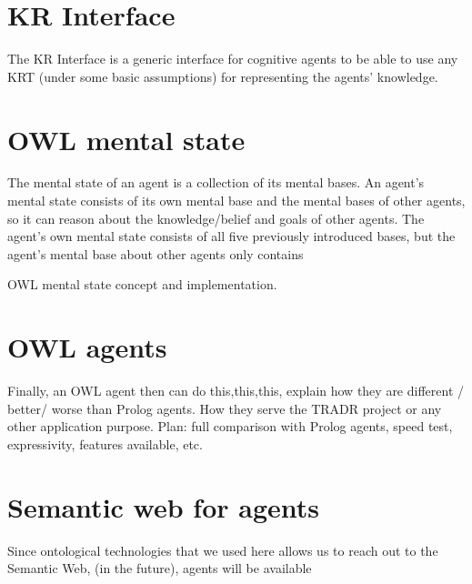 \section{KR Interface}

The KR Interface is a generic interface for cognitive agents to be able to use any KRT (under some basic assumptions) for representing the agents' knowledge. 


\section{OWL mental state}

The mental state of an agent is a collection of its mental bases. An agent's mental state consists of its own mental base and the mental bases of other agents, so it can reason about the knowledge/belief and goals of other agents. The agent's own mental state consists of all five previously introduced bases, but the agent's mental base about other agents only contains

OWL mental state concept and implementation.

\section{OWL agents}

Finally, an OWL agent then can do this,this,this, explain how they are different / better/ worse than Prolog agents. How they serve the TRADR project or any other application purpose. 
Plan: full comparison with Prolog agents, speed test, expressivity, features available, etc.

\section{Semantic web for agents}

Since ontological technologies that we used here allows us to reach out to the Semantic Web,
(in the future), agents will be available 


  
  
  
  
  
  
  
  